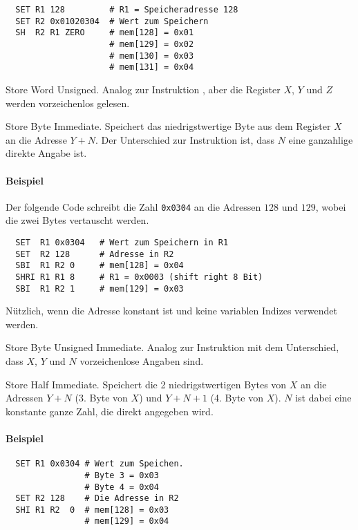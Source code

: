 \begin{lstlisting}
  SET R1 128         # R1 = Speicheradresse 128
  SET R2 0x01020304  # Wert zum Speichern
  SH  R2 R1 ZERO     # mem[128] = 0x01
                     # mem[129] = 0x02
                     # mem[130] = 0x03
                     # mem[131] = 0x04
\end{lstlisting}


\glqq Store Word Unsigned\grqq.
Analog zur Instruktion , aber die Register $X$, $Y$ und $Z$ werden
vorzeichenlos gelesen.



\glqq Store Byte Immediate\grqq.
Speichert das niedrigstwertige Byte aus dem Register $X$ an die Adresse $Y + N$.
Der Unterschied zur Instruktion  ist, dass $N$ eine ganzahlige
direkte Angabe ist.

\paragraph{Beispiel}
Der folgende Code schreibt die Zahl \texttt{0x0304} an die Adressen $128$ und
$129$, wobei die zwei Bytes vertauscht werden.
\begin{lstlisting}
  SET  R1 0x0304   # Wert zum Speichern in R1
  SET  R2 128      # Adresse in R2
  SBI  R1 R2 0     # mem[128] = 0x04
  SHRI R1 R1 8     # R1 = 0x0003 (shift right 8 Bit)
  SBI  R1 R2 1     # mem[129] = 0x03
\end{lstlisting}
Nützlich, wenn die Adresse konstant ist und keine variablen Indizes verwendet
werden.


\glqq Store Byte Unsigned Immediate\grqq.
Analog zur Instruktion  mit dem Unterschied, dass $X$, $Y$ und $N$
vorzeichenlose Angaben sind.



\glqq Store Half Immediate\grqq.
Speichert die 2 niedrigstwertigen Bytes von $X$ an die Adressen 
$Y + N$ (3. Byte von $X$) und $Y + N + 1$ (4. Byte von $X$).
$N$ ist dabei eine konstante ganze Zahl, die direkt angegeben wird. 

\paragraph{Beispiel}
\begin{lstlisting}
  SET R1 0x0304 # Wert zum Speichen.
                # Byte 3 = 0x03
                # Byte 4 = 0x04
  SET R2 128    # Die Adresse in R2
  SHI R1 R2  0  # mem[128] = 0x03
                # mem[129] = 0x04
\end{lstlisting}



